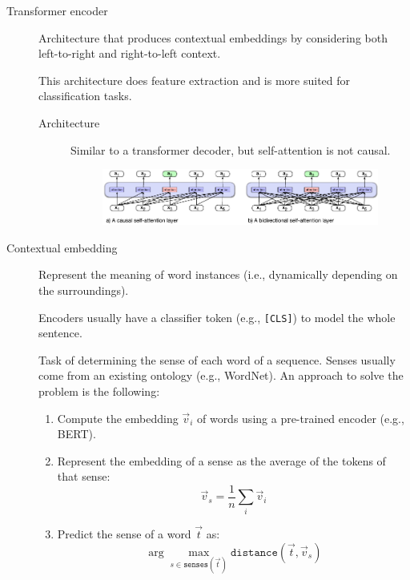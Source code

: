 \begin{description}
    \item[Transformer encoder] 
        Architecture that produces contextual embeddings by considering both left-to-right and right-to-left context.

        \begin{remark}
            This architecture does feature extraction and is more suited for classification tasks.
        \end{remark}

        \begin{description}
            \item[Architecture]
                Similar to a transformer decoder, but self-attention is not causal.

                \begin{figure}[H]
                    \centering
                    \includegraphics[width=0.75\linewidth]{./img/_decoder_vs_encoder.pdf}
                \end{figure}
        \end{description}

    \item[Contextual embedding] 
        Represent the meaning of word instances (i.e., dynamically depending on the surroundings).

        \begin{remark}
            Encoders usually have a classifier token (e.g., \texttt{[CLS]}) to model the whole sentence.
        \end{remark}

        \begin{example}
            Task of determining the sense of each word of a sequence. Senses usually come from an existing ontology (e.g., WordNet). An approach to solve the problem is the following:
            \begin{enumerate}
                \item Compute the embedding $\vec{v}_i$ of words using a pre-trained encoder (e.g., BERT).
                \item Represent the embedding of a sense as the average of the tokens of that sense:
                \[ \vec{v}_s = \frac{1}{n} \sum_i \vec{v}_i \]
                \item Predict the sense of a word $\vec{t}$ as:
                \[ \arg\max_{s \in \texttt{senses}(\vec{t})} \texttt{distance}(\vec{t}, \vec{v}_s) \]
            \end{enumerate}
        \end{example}
\end{description}

